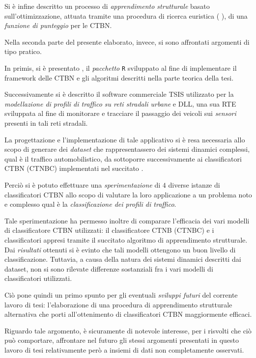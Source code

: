 Si è infine descritto un processo di \emph{apprendimento strutturale} basato sull'ottimizzazione, attuata tramite una procedura di ricerca euristica (\ie{} \emph{\hc{}}), di una \emph{funzione di punteggio} per le \acs{CTBN}.

Nella seconda parte del presente elaborato, invece, si sono affrontati argomenti di tipo pratico.

In primis, si è presentato \rctbn{}, il \emph{pacchetto} \lstinline$R$ sviluppato al fine di implementare il framework delle \acs{CTBN} e gli algoritmi descritti nella parte teorica della tesi.

Successivamente si è descritto il software commerciale \acs{TSIS} utilizzato per la \emph{modellazione di profili di traffico su reti stradali urbane} e  \acs{DLL}, una sua \acl{RTE} sviluppata al fine di monitorare e tracciare il passaggio dei veicoli sui \emph{sensori} presenti in tali reti stradali.

La progettazione e l'implementazione di tale applicativo si è resa necessaria allo scopo di generare dei \emph{dataset} che rappresentassero dei sistemi dinamici complessi, qual è il traffico automobilistico, da sottoporre successivamente ai classificatori \acs{CTBN} (\acs{CTNBC}) implementati nel succitato \pacchettor{}.

Perciò si è potuto effettuare una \emph{sperimentazione} di $4$ diverse istanze di classificatori \acs{CTBN} allo scopo di valutare la loro applicazione a un problema noto e complesso qual è la \emph{classificazione dei profili di traffico}.

Tale sperimentazione ha permesso inoltre di comparare l'efficacia dei vari modelli di classificatore \acs{CTBN} utilizzati: il classificatore \acl{CTNB} (\acs{CTNBC}) e i classificatori appresi tramite il succitato algoritmo di apprendimento strutturale. Dai \emph{risultati} ottenuti si è evinto che tali modelli ottengono un buon livello di classificazione. Tuttavia, a causa della natura dei sistemi dinamici descritti dai dataset, non si sono rilevate differenze sostanziali fra i vari modelli di classificatori utilizzati.

Ciò pone quindi un primo spunto per gli eventuali \emph{sviluppi futuri} del corrente lavoro di tesi: l'elaborazione di una procedura di apprendimento strutturale alternativa che porti all'ottenimento di classificatori \acs{CTBN} maggiormente efficaci.

Riguardo tale argomento, è sicuramente di notevole interesse, per i risvolti che ciò può comportare, affrontare nel futuro gli stessi argomenti presentati in questo lavoro di tesi relativamente però a insiemi di dati non completamente osservati.

